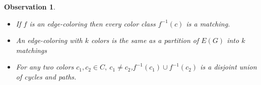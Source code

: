 \documentclass[a4paper]{article}
\theoremstyle{plain}
\newtheorem{observation}[lemma]{Observation}
\theoremstyle{myremark}
\begin{document}
\begin {observation}\begin{minipage}[t]{\linewidth}
\begin {itemize}
\item If $f$ is an edge-coloring then every color class $f^{-1}(c)$ is a matching.
\item An edge-coloring with $k$ colors is the same as a partition of $E(G)$ into $k$ matchings
\item For any two colors $c_1,c_2\in C,\:c_1\neq c_2$,\:$f^{-1}(c_1)\cup f^{-1}(c_2)$ is a disjoint union of cycles and paths.
\end {itemize}
\end {minipage}
\end {observation}
\begin {center}

\end{center}
\end{document}
